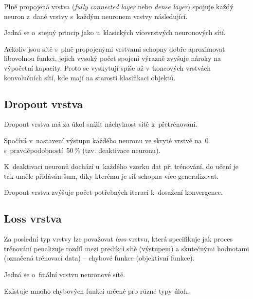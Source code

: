 \begin{compactitem}
    \item Plně propojená vrstva (\textit{fully connected layer} nebo \textit{dense layer}) spojuje každý neuron z~dané vrstvy s~každým neuronem vrstvy následující.

    \item Jedná se o~stejný princip jako u~klasických vícevrstvých neuronových sítí.

    \item Ačkoliv jsou sítě s~plně propojenými vrstvami schopny dobře aproximovat libovolnou funkci, jejich vysoký počet spojení výrazně zvyšuje nároky na výpočetní kapacity. Proto se vyskytují spíše až v~koncových vrstvách konvolučních sítí, kde mají na starosti klasifikaci objektů.
\end{compactitem}

\subsection{Dropout vrstva}

\begin{compactitem}
    \item Dropout vrstva má za úkol snížit náchylnost sítě k~přetrénování.

    \item Spočívá v~nastavení výstupu každého neuronu ve skryté vrstvě na~0 s~pravděpodobností~50\,\% (tzv. deaktivace neuronu).

    \item K~deaktivaci neuronů dochází u~každého vzorku dat při trénování, do učení je tak uměle přidáván šum, díky kterému je síť schopna více generalizovat.

    \item Dropout vrstva zvýšuje počet potřebných iterací k~dosažení konvergence.
\end{compactitem}

\subsection{Loss vrstva}

\begin{compactitem}
    \item Za poslední typ vrstvy lze považovat \textit{loss} vrstvu, která specifikuje jak proces trénování penalizuje rozdíl mezi predikcí sítě (výstupem) a skutečnými hodnotami (označená trénovací data) -- chybové funkce (objektivní funkce).

    \item Jedná se o~finální vrstvu neuronové sítě.

    \item Existuje mnoho chybových funkcí určené pro různé typy úloh.
\end{compactitem}


